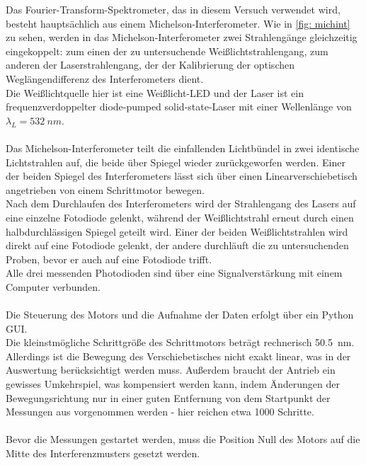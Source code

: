 \documentclass[10pt,a4paper]{article}
\begin{document}
Das Fourier-Transform-Spektrometer, das in diesem Versuch verwendet wird, besteht hauptsächlich aus einem Michelson-Interferometer. Wie in \autoref{fig: michint} zu sehen, werden in das Michelson-Interferometer zwei Strahlengänge gleichzeitig eingekoppelt: zum einen der zu untersuchende Weißlichtstrahlengang, zum anderen der Laserstrahlengang, der der Kalibrierung der optischen Weglängendifferenz des Interferometers dient.\\
Die Weißlichtquelle hier ist eine Weißlicht-LED und der Laser ist ein frequenzverdoppelter diode-pumped solid-state-Laser mit einer Wellenlänge von $\lambda_L=\qty{532}{nm}$.\\\\
Das Michelson-Interferometer teilt die einfallenden Lichtbündel in zwei identische Lichtstrahlen auf, die beide über Spiegel wieder zurückgeworfen werden. Einer der beiden Spiegel des Interferometers lässt sich über einen Linearverschiebetisch angetrieben von einem Schrittmotor bewegen.\\
Nach dem  Durchlaufen des Interferometers wird der Strahlengang des Lasers auf eine einzelne Fotodiode gelenkt, während der Weißlichtstrahl erneut durch einen halbdurchlässigen Spiegel geteilt wird. Einer der beiden Weißlichtstrahlen wird direkt auf eine Fotodiode gelenkt, der andere durchläuft die zu untersuchenden Proben, bevor er auch auf eine Fotodiode trifft.\\
Alle drei messenden Photodioden sind über eine Signalverstärkung mit einem Computer verbunden.\\\\
Die Steuerung des Motors und die Aufnahme der Daten erfolgt über ein Python GUI.\\
Die kleinstmögliche Schrittgröße des Schrittmotors beträgt rechnerisch \qty{50,5}{nm}. Allerdings ist die Bewegung des Verschiebetisches nicht exakt linear, was in der Auswertung berücksichtigt werden muss. Außerdem braucht der Antrieb ein gewisses Umkehrspiel, was kompensiert werden kann, indem Änderungen der Bewegungsrichtung nur in einer guten Entfernung von dem Startpunkt der Messungen aus vorgenommen werden - hier reichen etwa 1000 Schritte.\\\\
Bevor die Messungen gestartet werden, muss die Position Null des Motors auf die Mitte des Interferenzmusters gesetzt werden.
\end{document}
